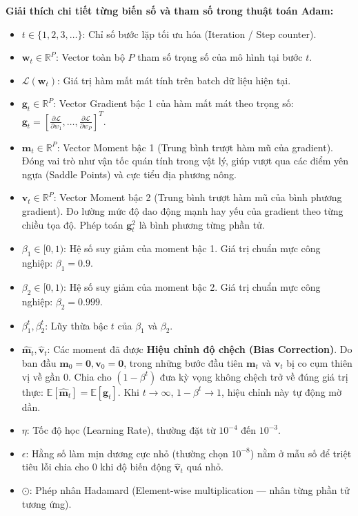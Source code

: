 \documentclass[10pt,a4paper]{article}
\begin{document}
\textbf{Giải thích chi tiết từng biến số và tham số trong thuật toán Adam:}
\begin{itemize}[leftmargin=*]
    \item $t \in \{1, 2, 3, \dots\}$: Chỉ số bước lặp tối ưu hóa (Iteration / Step counter).
    \item $\mathbf{w}_t \in \mathbb{R}^P$: Vector toàn bộ $P$ tham số trọng số của mô hình tại bước $t$.
    \item $\mathcal{L}(\mathbf{w}_t)$: Giá trị hàm mất mát tính trên batch dữ liệu hiện tại.
    \item $\mathbf{g}_t \in \mathbb{R}^P$: Vector Gradient bậc 1 của hàm mất mát theo trọng số: $\mathbf{g}_t = \left[ \frac{\partial \mathcal{L}}{\partial w_1}, \dots, \frac{\partial \mathcal{L}}{\partial w_P} \right]^T$.
    \item $\mathbf{m}_t \in \mathbb{R}^P$: Vector Moment bậc 1 (Trung bình trượt hàm mũ của gradient). Đóng vai trò như vận tốc quán tính trong vật lý, giúp vượt qua các điểm yên ngựa (Saddle Points) và cực tiểu địa phương nông.
    \item $\mathbf{v}_t \in \mathbb{R}^P$: Vector Moment bậc 2 (Trung bình trượt hàm mũ của bình phương gradient). Đo lường mức độ dao động mạnh hay yếu của gradient theo từng chiều tọa độ. Phép toán $\mathbf{g}_t^2$ là bình phương từng phần tử.
    \item $\beta_1 \in [0, 1)$: Hệ số suy giảm của moment bậc 1. Giá trị chuẩn mực công nghiệp: $\beta_1 = 0.9$.
    \item $\beta_2 \in [0, 1)$: Hệ số suy giảm của moment bậc 2. Giá trị chuẩn mực công nghiệp: $\beta_2 = 0.999$.
    \item $\beta_1^t, \beta_2^t$: Lũy thừa bậc $t$ của $\beta_1$ và $\beta_2$.
    \item $\hat{\mathbf{m}}_t, \hat{\mathbf{v}}_t$: Các moment đã được \textbf{Hiệu chỉnh độ chệch (Bias Correction)}. Do ban đầu $\mathbf{m}_0 = \mathbf{0}, \mathbf{v}_0 = \mathbf{0}$, trong những bước đầu tiên $\mathbf{m}_t$ và $\mathbf{v}_t$ bị co cụm thiên vị về gần 0. Chia cho $(1 - \beta^t)$ đưa kỳ vọng không chệch trở về đúng giá trị thực: $\mathbb{E}[\hat{\mathbf{m}}_t] = \mathbb{E}[\mathbf{g}_t]$. Khi $t \to \infty$, $1 - \beta^t \to 1$, hiệu chỉnh này tự động mờ dần.
    \item $\eta$: Tốc độ học (Learning Rate), thường đặt từ $10^{-4}$ đến $10^{-3}$.
    \item $\epsilon$: Hằng số làm mịn dương cực nhỏ (thường chọn $10^{-8}$) nằm ở mẫu số để triệt tiêu lỗi chia cho 0 khi độ biến động $\hat{\mathbf{v}}_t$ quá nhỏ.
    \item $\odot$: Phép nhân Hadamard (Element-wise multiplication --- nhân từng phần tử tương ứng).
\end{itemize}
\end{document}
